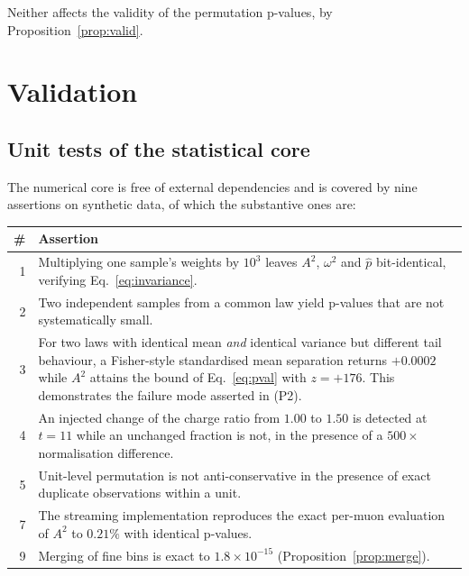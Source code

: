\documentclass[11pt,a4paper]{article}
\theoremstyle{definition}
\theoremstyle{plain}
\theoremstyle{remark}
\begin{document}
Neither affects the validity of the permutation p-values, by
Proposition~\ref{prop:valid}.

\section{Validation}
\label{sec:validation}

\subsection{Unit tests of the statistical core}

The numerical core is free of external dependencies and is covered by nine
assertions on synthetic data, of which the substantive ones are:

\begin{center}
\small
\begin{tabular}{@{}rp{}@{}}
\toprule
\# & Assertion \\
\midrule
1 & Multiplying one sample's weights by $10^{3}$ leaves $A^{2}$, $\omega^{2}$
    and $\hat{p}$ bit-identical, verifying Eq.~\eqref{eq:invariance}. \\
2 & Two independent samples from a common law yield p-values that are not
    systematically small. \\
3 & For two laws with identical mean \emph{and} identical variance but
    different tail behaviour, a Fisher-style standardised mean separation
    returns $+0.0002$ while $A^{2}$ attains the bound of Eq.~\eqref{eq:pval}
    with $z = +176$. This demonstrates the failure mode asserted in (P2). \\
4 & An injected change of the charge ratio from $1.00$ to $1.50$ is detected at
    $t = 11$ while an unchanged fraction is not, in the presence of a
    $500\times$ normalisation difference. \\
5 & Unit-level permutation is not anti-conservative in the presence of exact
    duplicate observations within a unit. \\
7 & The streaming implementation reproduces the exact per-muon evaluation of
    $A^{2}$ to $0.21\%$ with identical p-values. \\
9 & Merging of fine bins is exact to $1.8\times10^{-15}$
    (Proposition~\ref{prop:merge}). \\
\bottomrule
\end{tabular}
\end{center}
\end{document}
